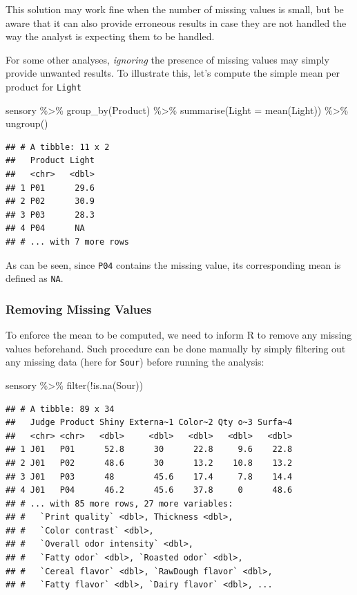 \documentclass[
]{krantz}
\makeatletter
\newenvironment{Shaded}{\begin{snugshade}}{\end{snugshade}}
\newcommand{\AttributeTok}[1]{\textcolor[rgb]{0.61,0.61,0.61}{#1}}
\newcommand{\FunctionTok}[1]{\textcolor[rgb]{0,0,0}{#1}}
\newcommand{\NormalTok}[1]{#1}
\newcommand{\SpecialCharTok}[1]{\textcolor[rgb]{0,0,0}{#1}}
\newenvironment{kframe}{%
\medskip{}
\setlength{\fboxsep}{.8em}
 \def\at@end@of@kframe{}%
 \ifinner\ifhmode%
  \def\at@end@of@kframe{\end{minipage}}%
  \begin{minipage}{\columnwidth}%
 \fi\fi%
 \def\FrameCommand##1{\hskip\@totalleftmargin \hskip-\fboxsep
 \colorbox{shadecolor}{##1}\hskip-\fboxsep
     \hskip-\linewidth \hskip-\@totalleftmargin \hskip\columnwidth}%
 \MakeFramed {\advance\hsize-\width
   \@totalleftmargin\z@ \linewidth\hsize
   \@setminipage}}%
 {\par\unskip\endMakeFramed%
 \at@end@of@kframe}
\renewenvironment{Shaded}{\begin{kframe}}{\end{kframe}}
\makeatother
\begin{document}
This solution may work fine when the number of missing values is small, but be aware that it can also provide erroneous results in case they are not handled the way the analyst is expecting them to be handled.

For some other analyses, \emph{ignoring} the presence of missing values may simply provide unwanted results. To illustrate this, let's compute the simple mean per product for \texttt{Light}

\begin{Shaded}
\begin{Highlighting}[]
\NormalTok{sensory }\SpecialCharTok{\%\textgreater{}\%} 
  \FunctionTok{group\_by}\NormalTok{(Product) }\SpecialCharTok{\%\textgreater{}\%} 
  \FunctionTok{summarise}\NormalTok{(}\AttributeTok{Light =} \FunctionTok{mean}\NormalTok{(Light)) }\SpecialCharTok{\%\textgreater{}\%} 
  \FunctionTok{ungroup}\NormalTok{()}
\end{Highlighting}
\end{Shaded}

\begin{verbatim}
## # A tibble: 11 x 2
##   Product Light
##   <chr>   <dbl>
## 1 P01      29.6
## 2 P02      30.9
## 3 P03      28.3
## 4 P04      NA  
## # ... with 7 more rows
\end{verbatim}

As can be seen, since \texttt{P04} contains the missing value, its corresponding mean is defined as \texttt{NA}.

\hypertarget{removing-missing-values}{%
\subsubsection{Removing Missing Values}\label{removing-missing-values}}

To enforce the mean to be computed, we need to inform R to remove any missing values beforehand. Such procedure can be done manually by simply filtering out any missing data (here for \texttt{Sour}) before running the analysis:

\begin{Shaded}
\begin{Highlighting}[]
\NormalTok{sensory }\SpecialCharTok{\%\textgreater{}\%} 
  \FunctionTok{filter}\NormalTok{(}\SpecialCharTok{!}\FunctionTok{is.na}\NormalTok{(Sour))}
\end{Highlighting}
\end{Shaded}

\begin{verbatim}
## # A tibble: 89 x 34
##   Judge Product Shiny Externa~1 Color~2 Qty o~3 Surfa~4
##   <chr> <chr>   <dbl>     <dbl>   <dbl>   <dbl>   <dbl>
## 1 J01   P01      52.8      30      22.8     9.6    22.8
## 2 J01   P02      48.6      30      13.2    10.8    13.2
## 3 J01   P03      48        45.6    17.4     7.8    14.4
## 4 J01   P04      46.2      45.6    37.8     0      48.6
## # ... with 85 more rows, 27 more variables:
## #   `Print quality` <dbl>, Thickness <dbl>,
## #   `Color contrast` <dbl>,
## #   `Overall odor intensity` <dbl>,
## #   `Fatty odor` <dbl>, `Roasted odor` <dbl>,
## #   `Cereal flavor` <dbl>, `RawDough flavor` <dbl>,
## #   `Fatty flavor` <dbl>, `Dairy flavor` <dbl>, ...
\end{verbatim}
\end{document}
